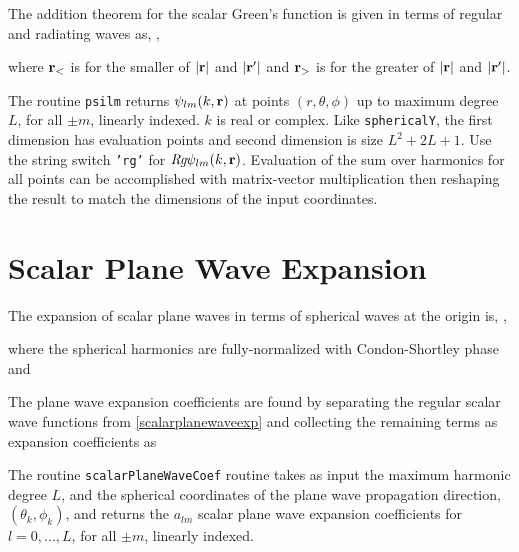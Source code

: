 The addition theorem for the scalar Green's function is given in terms of regular and radiating waves as, \cite{chew1995waves},

\noindent where $\mathbf{r}_{<}$ is for the smaller of $\vert \mathbf{r} \vert$ and $\vert \mathbf{r}'\vert $ and $\mathbf{r}_{>}$ is for the greater of $\vert \mathbf{r}\vert$ and $\vert \mathbf{r}'\vert$.


The routine \texttt{psilm} returns $\psi_{lm}(k,\mathbf{r})$ at points $(r,\theta,\phi)$ up to maximum degree $L$, for all $\pm m$, linearly indexed.  $k$ is real or complex.  Like \texttt{sphericalY}, the first dimension has evaluation points and second dimension is size $L^2 + 2L+1$.  Use the string switch \texttt{'rg'} for $\textit{Rg} \psi_{lm}(k,\mathbf{r})$. Evaluation of the sum over harmonics for all points can be accomplished with matrix-vector multiplication then reshaping the result to match the dimensions of the input coordinates.

{\footnotesize
{}
}

\section{Scalar Plane Wave Expansion}

The expansion of scalar plane waves in terms of spherical waves at the origin is, \cite{tsang2000scattering},

\noindent where the spherical harmonics are fully-normalized with Condon-Shortley phase and 

The plane wave expansion coefficients are found by separating the regular scalar wave functions from \eqref{scalarplanewaveexp} and collecting the remaining terms as expansion coefficients as

The routine \texttt{scalarPlaneWaveCoef} routine takes as input the maximum harmonic degree $L$, and the spherical coordinates of the plane wave propagation direction, $(\theta_k, \phi_k)$, and returns the $a_{lm}$ scalar plane wave expansion coefficients for $l = 0,...,L$, for all $\pm m$, linearly indexed. 


